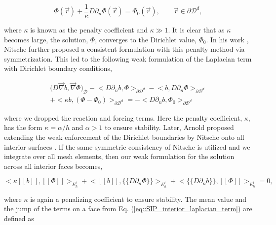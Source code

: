 \begin{equation}
\label{eq::penalty_boundary_term}
\Phi (\vec{r}) +\frac{1}{\kappa} D \partial_n \Phi (\vec{r}) = \Phi_0 (\vec{r}), \qquad \vec{r} \in \partial \mathcal{D}^d, 
\end{equation}

\noindent where $\kappa$ is known as the penalty coefficient and $\kappa \gg 1$. It is clear that as $\kappa$ becomes large, the solution, $\Phi$, converges to the Dirichlet value, $\Phi_0$. In his work \cite{ref::nitsche_IP}, Nitsche further proposed a consistent formulation with this penalty method via symmetrization. This led to the following weak formulation of the Laplacian term with Dirichlet boundary conditions,

\begin{equation}
\label{eq::SIP_boundary_laplacian_term}
\begin{aligned}
\Big(  D \vec{\nabla}  b , \vec{\nabla} \Phi  \Big)_{\mathcal{D}} - \Big<   D \partial_n b, \Phi \Big>_{\partial \mathcal{D}^d} - \Big<  b, D \partial_n \Phi \Big>_{\partial \mathcal{D}^d} \\ + \Big< \kappa b,  (\Phi - \Phi_0) \Big>_{\partial \mathcal{D}^d} = - \Big< D \partial_n b ,  \Phi_0 \Big>_{\partial \mathcal{D}^d} 
\end{aligned}
\end{equation}

\noindent where we dropped the reaction and forcing terms. Here the penalty coefficient, $\kappa$, has the form $\kappa = \alpha / h$ and $\alpha > 1$ to ensure stability. Later, Arnold proposed extending the weak enforcement of the Dirichlet boundaries by Nitsche onto all interior surfaces \cite{ref::arnold_1982_IP}. If the same symmetric consistency of Nitsche is utilized and we integrate over all mesh elements, then our weak formulation for the solution across all interior faces becomes,

\begin{equation}
\label{eq::SIP_interior_laplacian_term}
\Big< \kappa [\![   b ]\!] , [\![  \Phi ]\!]\Big>_{E_h^i} + \Big<  [\![   b ]\!] , \{\!\{  D \partial_n \Phi \}\!\}\Big>_{E_h^i} + \Big< \{\!\{  D \partial_n  b \}\!\} , [\![  \Phi ]\!]\Big>_{E_h^i} = 0 ,
\end{equation}

\noindent where $\kappa$ is again a penalizing coefficient to ensure stability. The mean value and the jump of the terms on a face from Eq. (\ref{eq::SIP_interior_laplacian_term}) are defined as

